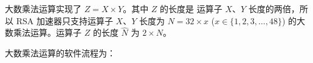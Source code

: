 \documentclass[main\_\_CN.tex]{subfiles}
\begin{document}
大数乘法运算实现了 \begin{math}Z = X \times Y\end{math}。其中 \begin{math}Z\end{math} 的长度是
运算子 \begin{math}X\end{math}、\begin{math}Y\end{math} 长度的两倍，所以 RSA 加速器只支持运算子 $X$、$Y$ 长度为 \begin{math}N = 32 \times x\end{math} (\begin{math}x \in \{ 1, 2, 3, \dots, 48\} \end{math}) 的大数乘法运算。运算子 \begin{math}Z\end{math} 的长度 \begin{math}\hat{N}\end{math} 为 \begin{math}2 \times N\end{math}。


大数乘法运算的软件流程为：
\end{document}
